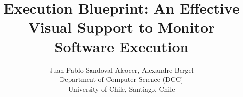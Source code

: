 \documentclass[10pt, conference, compsocconf]{IEEEtran}
\newcommand{\Title}{Execution Blueprint: An Effective Visual Support to Monitor Software Execution}
\newcommand{\TitleShort}{\Title}
\newcommand{\Authors}{Juan Pablo Sandoval Alcocer, Alexandre Bergel}
\newcommand{\AuthorsShort}{J.P. Sandoval Alcocer, A. Bergel}
\begin{document}
\title{\Title}

\author{\Authors\\[3mm]
Department of Computer Science (DCC)\\ University of Chile, Santiago, Chile\\[1 ex]
} 

\maketitle


\end{document}
